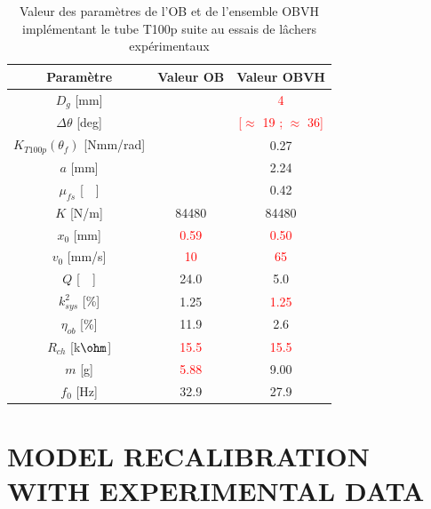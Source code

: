 \documentclass[3p,twocolumn,preprint]{elsarticle}
\begin{document}
\begin{table}[!htbp]
	\centering
		\begin{tabular}[t]{c|c|c}
\toprule
\multicolumn{1}{c}{\textbf{Paramètre}}	&
\multicolumn{1}{c}{\textbf{Valeur OB}} 	& 
\multicolumn{1}{c}{\textbf{Valeur OBVH}}  \\
\midrule
$D_g$ [mm] 						& \cellcolor{ashgrey} 		& \textcolor{red}{4} 		\\ \hline
$\Delta\theta$ [deg] 			& \cellcolor{ashgrey} 		& \textcolor{red}{{[$\approx$ 19 ; $\approx$ 36]}} \\ \hline
$K_{T100p}(\theta_f)$ [Nmm/rad] & \cellcolor{ashgrey}  		&  0.27 					\\ \hline
$a$ [mm]         			    & \cellcolor{ashgrey}  		&  2.24				 	 	\\ \hline
$\mu_{fs}$ [~~] 				& \cellcolor{ashgrey}  		&  0.42  					\\ \hline
$K$ [N/m] 						&	84480			  	 	&  84480  					\\ \hline
$x_0$ [mm] 						& \textcolor{red}{0.59}		& \textcolor{red}{0.50}  	\\ \hline
$v_0$ [mm/s] 					& \textcolor{red}{10}		& \textcolor{red}{65}  		\\ \hline
$Q$	[~~] 						& 		24.0		 		& 5.0     					\\ \hline
$k^2_{sys}$ [\%] 				& 		1.25		 		& \textcolor{red}{1.25}   	\\ \hline
$\eta_{ob}$ [\%] 				& 		11.9		 		& 2.6   					\\ \hline	
$R_{ch}$ [k$\text{\ohm}$] 		&	\textcolor{red}{15.5}	& \textcolor{red}{15.5}    	\\ \hline		
$m$	[g]						    &	\textcolor{red}{5.88}	& 9.00   					\\ \hline	
$f_0$ [Hz]						&		32.9				& 27.9   					\\
\bottomrule	
	\end{tabular}
        \caption{Valeur des paramètres de l'OB et de l'ensemble OBVH implémentant le tube T100p suite au essais de lâchers expérimentaux}
        \label{tab:parametres lacher tube}
\end{table}        

\section{MODEL RECALIBRATION WITH EXPERIMENTAL DATA}
\label{sec:MODEL RECALIBRATION WITH EXPERIMENTAL DATA}
\end{document}
